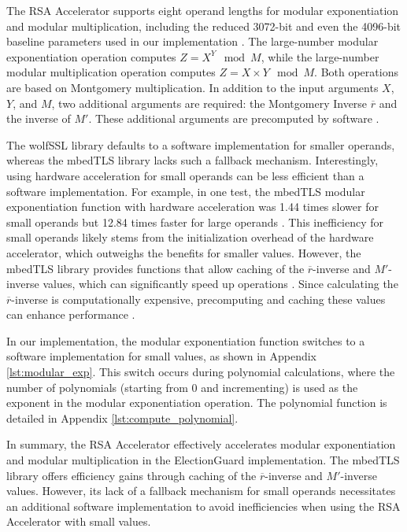The RSA Accelerator supports eight operand lengths for modular exponentiation and modular multiplication, including the reduced 3072-bit and even the 4096-bit baseline parameters used in our implementation \cite[598]{esp32-ref}. The large-number modular exponentiation operation computes \( Z = X^Y \mod M \), while the large-number modular multiplication operation computes \( Z = X \times Y \mod M \). Both operations are based on Montgomery multiplication. In addition to the input arguments \( X \), \( Y \), and \( M \), two additional arguments are required: the Montgomery Inverse \( \overline{r} \) and the inverse of \( M' \). These additional arguments are precomputed by software \cite[598-599]{esp32-ref}.

The wolfSSL library defaults to a software implementation for smaller operands, whereas the mbedTLS library lacks such a fallback mechanism. Interestingly, using hardware acceleration for small operands can be less efficient than a software implementation. For example, in one test, the mbedTLS modular exponentiation function with hardware acceleration was 1.44 times slower for small operands but 12.84 times faster for large operands \cite[51]{eval-crypto}. This inefficiency for small operands likely stems from the initialization overhead of the hardware accelerator, which outweighs the benefits for smaller values. However, the mbedTLS library provides functions that allow caching of the \( \overline{r} \)-inverse and \( M' \)-inverse values, which can significantly speed up operations \cite[51]{eval-crypto}. Since calculating the \( \overline{r} \)-inverse is computationally expensive, precomputing and caching these values can enhance performance \cite[51]{eval-crypto}.

In our implementation, the modular exponentiation function switches to a software implementation for small values, as shown in Appendix \ref{lst:modular_exp}. This switch occurs during polynomial calculations, where the number of polynomials (starting from 0 and incrementing) is used as the exponent in the modular exponentiation operation. The polynomial function is detailed in Appendix \ref{lst:compute_polynomial}.

In summary, the RSA Accelerator effectively accelerates modular exponentiation and modular multiplication in the ElectionGuard implementation. The mbedTLS library offers efficiency gains through caching of the \( \overline{r} \)-inverse and \( M' \)-inverse values. However, its lack of a fallback mechanism for small operands necessitates an additional software implementation to avoid inefficiencies when using the RSA Accelerator with small values.


